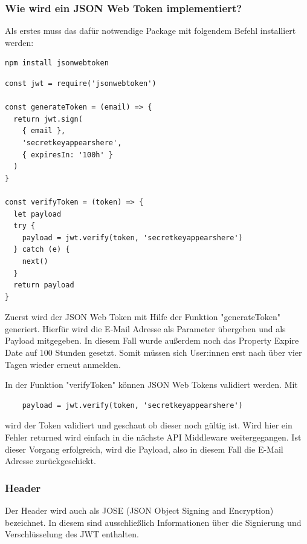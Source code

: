 \subsubsection{Wie wird ein JSON Web Token implementiert?}

Als erstes muss das dafür notwendige Package mit folgendem Befehl installiert werden:

\begin{lstlisting}
npm install jsonwebtoken
\end{lstlisting}


\begin{lstlisting}[caption=Implementierung JWT]
const jwt = require('jsonwebtoken')

const generateToken = (email) => {
  return jwt.sign(
    { email },
    'secretkeyappearshere',
    { expiresIn: '100h' }
  )
}

const verifyToken = (token) => {
  let payload
  try {
    payload = jwt.verify(token, 'secretkeyappearshere')
  } catch (e) {
    next()
  }
  return payload
}
\end{lstlisting}

Zuerst wird der JSON Web Token mit Hilfe der Funktion "generateToken" generiert. Hierfür wird die E-Mail Adresse als Parameter übergeben und als Payload mitgegeben. In diesem Fall wurde außerdem noch das Property Expire Date auf 100 Stunden gesetzt. Somit müssen sich User:innen erst nach über vier Tagen wieder erneut anmelden.

In der Funktion "verifyToken" können JSON Web Tokens validiert werden. Mit

\begin{lstlisting}
    payload = jwt.verify(token, 'secretkeyappearshere')
\end{lstlisting}

wird der Token validiert und geschaut ob dieser noch gültig ist. Wird hier ein Fehler returned wird einfach in die nächste API Middleware weitergegangen. Ist dieser Vorgang erfolgreich, wird die Payload, also in diesem Fall die E-Mail Adresse zurückgeschickt.


\subsubsection{Header}

Der Header wird auch als JOSE (JSON Object Signing and Encryption) bezeichnet. In diesem sind ausschließlich Informationen über die Signierung und Verschlüsselung des JWT enthalten.


